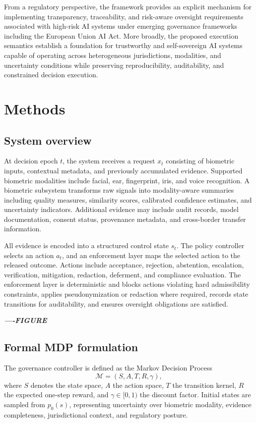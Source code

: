 \documentclass{article}
\begin{document}
From a regulatory perspective, the framework provides an explicit mechanism for implementing transparency, traceability, and risk-aware oversight requirements associated with high-risk AI systems under emerging governance frameworks including the European Union AI Act. More broadly, the proposed execution semantics establish a foundation for trustworthy and self-sovereign AI systems capable of operating across heterogeneous jurisdictions, modalities, and uncertainty conditions while preserving reproducibility, auditability, and constrained decision execution.


\section{Methods}

\subsection{System overview}

At decision epoch \(t\), the system receives a request \(x_t\) consisting of biometric inputs, contextual metadata, and previously accumulated evidence. Supported biometric modalities include facial, ear, fingerprint, iris, and voice recognition. A biometric subsystem transforms raw signals into modality-aware summaries including quality measures, similarity scores, calibrated confidence estimates, and uncertainty indicators. Additional evidence may include audit records, model documentation, consent status, provenance metadata, and cross-border transfer information.

All evidence is encoded into a structured control state \(s_t\). The policy controller selects an action \(a_t\), and an enforcement layer maps the selected action to the released outcome. Actions include acceptance, rejection, abstention, escalation, verification, mitigation, redaction, deferment, and compliance evaluation. The enforcement layer is deterministic and blocks actions violating hard admissibility constraints, applies pseudonymization or redaction where required, records state transitions for auditability, and ensures oversight obligations are satisfied.

\textit{\textbf{----FIGURE}}

\subsection{Formal MDP formulation}

The governance controller is defined as the Markov Decision Process
\begin{equation}
\mathcal{M}=(S,A,T,R,\gamma),
\end{equation}
where \(S\) denotes the state space, \(A\) the action space, \(T\) the transition kernel, \(R\) the expected one-step reward, and \(\gamma\in[0,1)\) the discount factor. Initial states are sampled from \(p_0(s)\), representing uncertainty over biometric modality, evidence completeness, jurisdictional context, and regulatory posture.
\end{document}
